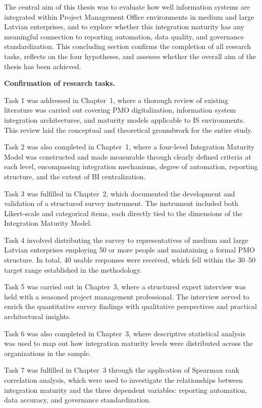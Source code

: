 
The central aim of this thesis was to evaluate how well information
systems are integrated within Project Management Office environments
in medium and large Latvian enterprises, and to explore whether this
integration maturity has any meaningful connection to reporting
automation, data quality, and governance standardization. This
concluding section confirms the completion of all research tasks,
reflects on the four hypotheses, and assesses whether the overall
aim of the thesis has been achieved.

\textbf{Confirmation of research tasks.}

Task 1 was addressed in Chapter~1, where a thorough review of
existing literature was carried out covering PMO digitalization,
information system integration architectures, and maturity models
applicable to IS environments. This review laid the conceptual and
theoretical groundwork for the entire study.

Task 2 was also completed in Chapter~1, where a four-level
Integration Maturity Model was constructed and made measurable
through clearly defined criteria at each level, encompassing
integration mechanisms, degree of automation, reporting structure,
and the extent of BI centralization.

Task 3 was fulfilled in Chapter~2, which documented the development
and validation of a structured survey instrument. The instrument
included both Likert-scale and categorical items, each directly
tied to the dimensions of the Integration Maturity Model.

Task 4 involved distributing the survey to representatives of
medium and large Latvian enterprises employing 50 or more people
and maintaining a formal PMO structure. In total, 40 usable
responses were received, which fell within the 30--50 target
range established in the methodology.

Task 5 was carried out in Chapter~3, where a structured expert
interview was held with a seasoned project management professional.
The interview served to enrich the quantitative survey findings
with qualitative perspectives and practical architectural insights.

Task 6 was also completed in Chapter~3, where descriptive
statistical analysis was used to map out how integration maturity
levels were distributed across the organizations in the sample.

Task 7 was fulfilled in Chapter~3 through the application of
Spearman rank correlation analysis, which were
used to investigate the relationships between integration maturity
and the three dependent variables: reporting automation, data
accuracy, and governance standardization.

